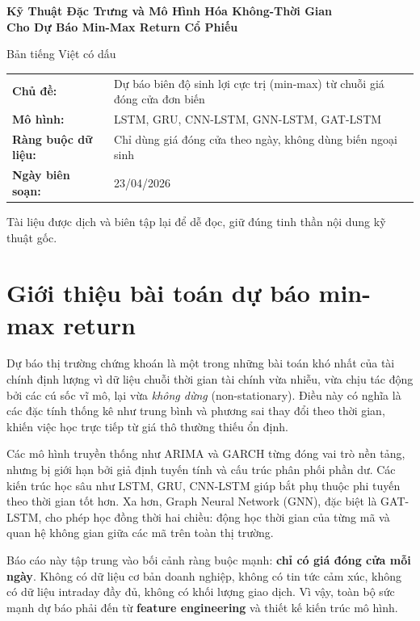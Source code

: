\documentclass[12pt,a4paper]{article}
\begin{document}
\begin{titlepage}
\centering
\vspace*{2cm}
{\Huge\bfseries\color{mainblue}Kỹ Thuật Đặc Trưng và Mô Hình Hóa Không-Thời Gian\\[0.4em]
Cho Dự Báo Min-Max Return Cổ Phiếu\par}
\vspace{0.9cm}
{\Large Bản tiếng Việt có dấu\par}
\vspace{1.8cm}
\begin{tabular}{L{4cm}L{9cm}}
\textbf{Chủ đề:} & Dự báo biên độ sinh lợi cực trị (min-max) từ chuỗi giá đóng cửa đơn biến \\
\textbf{Mô hình:} & LSTM, GRU, CNN-LSTM, GNN-LSTM, GAT-LSTM \\
\textbf{Ràng buộc dữ liệu:} & Chỉ dùng giá đóng cửa theo ngày, không dùng biến ngoại sinh \\
\textbf{Ngày biên soạn:} & 23/04/2026 \\
\end{tabular}
\vfill
{\small Tài liệu được dịch và biên tập lại để dễ đọc, giữ đúng tinh thần nội dung kỹ thuật gốc.}
\end{titlepage}

\tableofcontents
\newpage

\section{Giới thiệu bài toán dự báo min-max return}
Dự báo thị trường chứng khoán là một trong những bài toán khó nhất của tài chính định lượng vì dữ liệu chuỗi thời gian tài chính vừa nhiễu, vừa chịu tác động bởi các cú sốc vĩ mô, lại vừa \textit{không dừng} (non-stationary). Điều này có nghĩa là các đặc tính thống kê như trung bình và phương sai thay đổi theo thời gian, khiến việc học trực tiếp từ giá thô thường thiếu ổn định.

Các mô hình truyền thống như ARIMA và GARCH từng đóng vai trò nền tảng, nhưng bị giới hạn bởi giả định tuyến tính và cấu trúc phân phối phần dư. Các kiến trúc học sâu như LSTM, GRU, CNN-LSTM giúp bắt phụ thuộc phi tuyến theo thời gian tốt hơn. Xa hơn, Graph Neural Network (GNN), đặc biệt là GAT-LSTM, cho phép học đồng thời hai chiều: động học thời gian của từng mã và quan hệ không gian giữa các mã trên toàn thị trường.

Báo cáo này tập trung vào bối cảnh ràng buộc mạnh: \textbf{chỉ có giá đóng cửa mỗi ngày}. Không có dữ liệu cơ bản doanh nghiệp, không có tin tức cảm xúc, không có dữ liệu intraday đầy đủ, không có khối lượng giao dịch. Vì vậy, toàn bộ sức mạnh dự báo phải đến từ \textbf{feature engineering} và thiết kế kiến trúc mô hình.
\end{document}
